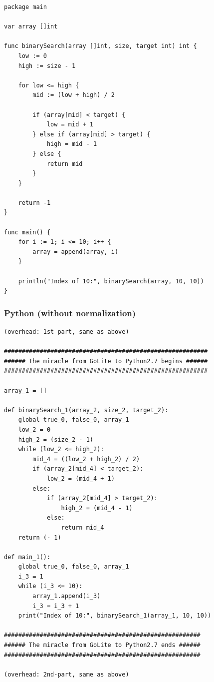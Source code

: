 \documentclass{article}
\begin{document}
\begin{lstlisting}
package main

var array []int

func binarySearch(array []int, size, target int) int {
    low := 0
    high := size - 1

    for low <= high {
        mid := (low + high) / 2
        
        if (array[mid] < target) {
            low = mid + 1
        } else if (array[mid] > target) {
            high = mid - 1
        } else {
            return mid
        }
    }

    return -1
}

func main() {
    for i := 1; i <= 10; i++ {
        array = append(array, i)
    }

    println("Index of 10:", binarySearch(array, 10, 10))
}
\end{lstlisting}

\subsubsection{Python (without normalization)}

\begin{lstlisting}
(overhead: 1st-part, same as above)

#########################################################
###### The miracle from GoLite to Python2.7 begins ######
#########################################################

array_1 = []

def binarySearch_1(array_2, size_2, target_2):
	global true_0, false_0, array_1
	low_2 = 0
	high_2 = (size_2 - 1)
	while (low_2 <= high_2):
		mid_4 = ((low_2 + high_2) / 2)
		if (array_2[mid_4] < target_2):
			low_2 = (mid_4 + 1)
		else:
			if (array_2[mid_4] > target_2):
				high_2 = (mid_4 - 1)
			else:
				return mid_4
	return (- 1)

def main_1():
	global true_0, false_0, array_1
	i_3 = 1
	while (i_3 <= 10):
		array_1.append(i_3)
		i_3 = i_3 + 1
	print("Index of 10:", binarySearch_1(array_1, 10, 10))

#######################################################
###### The miracle from GoLite to Python2.7 ends ######
#######################################################

(overhead: 2nd-part, same as above)
\end{lstlisting}
\end{document}

